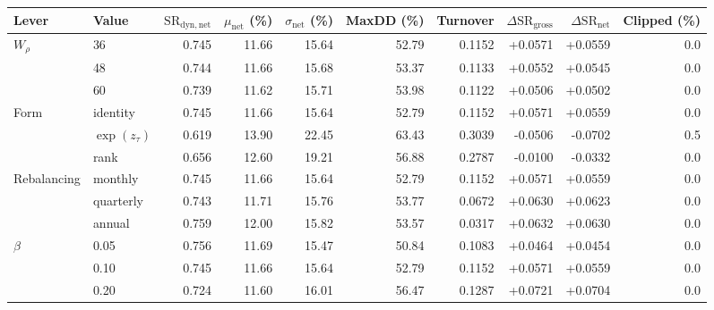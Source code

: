 \begin{tabular}{llrrrrrrrr}
\toprule
Lever & Value & $\mathrm{SR}_{\mathrm{dyn,net}}$ & $\mu_{\mathrm{net}}$ (\%) & $\sigma_{\mathrm{net}}$ (\%) & MaxDD (\%) & Turnover & $\Delta\mathrm{SR}_{\mathrm{gross}}$ & $\Delta\mathrm{SR}_{\mathrm{net}}$ & Clipped (\%) \\
\midrule
$W_\rho$ & 36 & 0.745 & 11.66 & 15.64 & 52.79 & 0.1152 & +0.0571 & +0.0559 & 0.0 \\
 & 48 & 0.744 & 11.66 & 15.68 & 53.37 & 0.1133 & +0.0552 & +0.0545 & 0.0 \\
 & 60 & 0.739 & 11.62 & 15.71 & 53.98 & 0.1122 & +0.0506 & +0.0502 & 0.0 \\
\addlinespace[5pt]
Form & identity & 0.745 & 11.66 & 15.64 & 52.79 & 0.1152 & +0.0571 & +0.0559 & 0.0 \\
 & $\exp(z_\tau)$ & 0.619 & 13.90 & 22.45 & 63.43 & 0.3039 & -0.0506 & -0.0702 & 0.5 \\
 & rank & 0.656 & 12.60 & 19.21 & 56.88 & 0.2787 & -0.0100 & -0.0332 & 0.0 \\
\addlinespace[5pt]
Rebalancing & monthly & 0.745 & 11.66 & 15.64 & 52.79 & 0.1152 & +0.0571 & +0.0559 & 0.0 \\
 & quarterly & 0.743 & 11.71 & 15.76 & 53.77 & 0.0672 & +0.0630 & +0.0623 & 0.0 \\
 & annual & 0.759 & 12.00 & 15.82 & 53.57 & 0.0317 & +0.0632 & +0.0630 & 0.0 \\
\addlinespace[5pt]
$\beta$ & 0.05 & 0.756 & 11.69 & 15.47 & 50.84 & 0.1083 & +0.0464 & +0.0454 & 0.0 \\
 & 0.10 & 0.745 & 11.66 & 15.64 & 52.79 & 0.1152 & +0.0571 & +0.0559 & 0.0 \\
 & 0.20 & 0.724 & 11.60 & 16.01 & 56.47 & 0.1287 & +0.0721 & +0.0704 & 0.0 \\
\bottomrule
\end{tabular}

